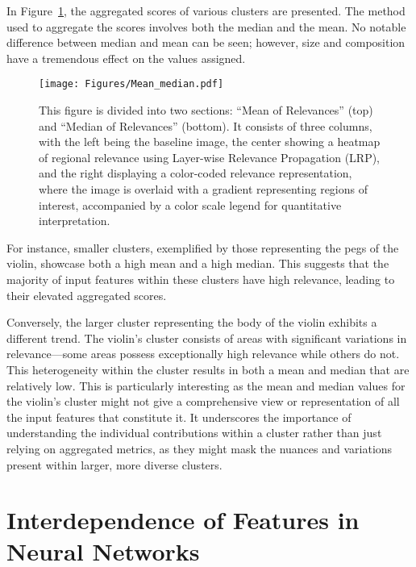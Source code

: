 In Figure~\ref{Fig:aggregating}, the aggregated scores of various clusters are presented. The method used to aggregate the scores involves both the median and the mean. No notable difference between median and mean can be seen; however, size and composition have a tremendous effect on the values assigned.

\begin{figure}[ht!]
	\centering
	\texttt{[image: Figures/Mean\_median.pdf]}
	\caption{This figure is divided into two sections: ``Mean of Relevances'' (top) and ``Median of Relevances'' (bottom). It consists of three columns, with the left being the baseline image, the center showing a heatmap of regional relevance using Layer-wise Relevance Propagation (LRP), and the right displaying a color-coded relevance representation, where the image is overlaid with a gradient representing regions of interest, accompanied by a color scale legend for quantitative interpretation.}
	\label{Fig:aggregating}
\end{figure} 

For instance, smaller clusters, exemplified by those representing the pegs of the violin, showcase both a high mean and a high median. This suggests that the majority of input features within these clusters have high relevance, leading to their elevated aggregated scores.

Conversely, the larger cluster representing the body of the violin exhibits a different trend. The violin's cluster consists of areas with significant variations in relevance—some areas possess exceptionally high relevance while others do not. This heterogeneity within the cluster results in both a mean and median that are relatively low. This is particularly interesting as the mean and median values for the violin's cluster might not give a comprehensive view or representation of all the input features that constitute it. It underscores the importance of understanding the individual contributions within a cluster rather than just relying on aggregated metrics, as they might mask the nuances and variations present within larger, more diverse clusters.

\section{Interdependence of Features in Neural Networks}

